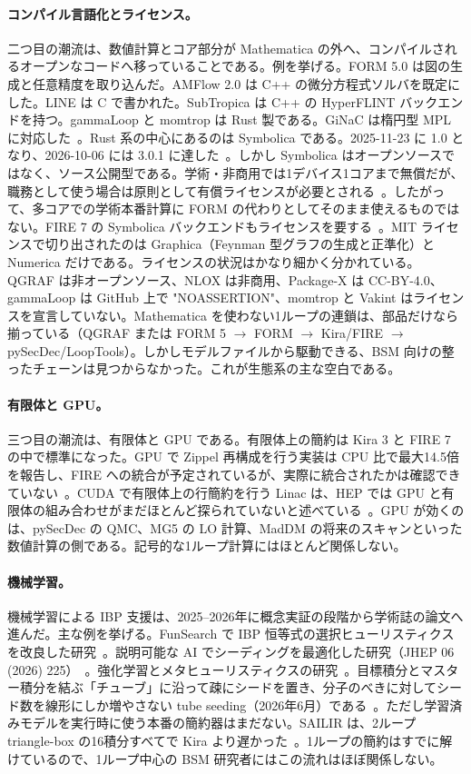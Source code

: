 \documentclass[a4paper,10pt]{ltjsarticle}
\begin{document}
\paragraph{コンパイル言語化とライセンス。}二つ目の潮流は、数値計算とコア部分が Mathematica の外へ、コンパイルされるオープンなコードへ移っていることである。例を挙げる。FORM 5.0 は図の生成と任意精度を取り込んだ。AMFlow 2.0 は C++ の微分方程式ソルバを既定にした。LINE は C で書かれた。SubTropica は C++ の HyperFLINT バックエンドを持つ。gammaLoop と momtrop は Rust 製である。GiNaC は楕円型 MPL に対応した~\cite{r16,r95,r116}。Rust 系の中心にあるのは Symbolica である。2025-11-23 に 1.0 となり、2026-10-06 には 3.0.1 に達した~\cite{r161,r162}。しかし Symbolica はオープンソースではなく、ソース公開型である。学術・非商用では1デバイス1コアまで無償だが、職務として使う場合は原則として有償ライセンスが必要とされる~\cite{r163}。したがって、多コアでの学術本番計算に FORM の代わりとしてそのまま使えるものではない。FIRE 7 の Symbolica バックエンドもライセンスを要する~\cite{r76}。MIT ライセンスで切り出されたのは Graphica（Feynman 型グラフの生成と正準化）と Numerica だけである。ライセンスの状況はかなり細かく分かれている。QGRAF は非オープンソース、NLOX は非商用、Package-X は CC-BY-4.0、gammaLoop は GitHub 上で "NOASSERTION"、momtrop と Vakint はライセンスを宣言していない。Mathematica を使わない1ループの連鎖は、部品だけなら揃っている（QGRAF または FORM 5 $\to$ FORM $\to$ Kira/FIRE $\to$ pySecDec/LoopTools）。しかしモデルファイルから駆動できる、BSM 向けの整ったチェーンは見つからなかった。これが生態系の主な空白である。

\paragraph{有限体と GPU。}三つ目の潮流は、有限体と GPU である。有限体上の簡約は Kira 3 と FIRE 7 の中で標準になった。GPU で Zippel 再構成を行う実装は CPU 比で最大14.5倍を報告し、FIRE への統合が予定されているが、実際に統合されたかは確認できていない~\cite{r164}。CUDA で有限体上の行簡約を行う Linac は、HEP では GPU と有限体の組み合わせがまだほとんど探られていないと述べている~\cite{r165}。GPU が効くのは、pySecDec の QMC、MG5 の LO 計算、MadDM の将来のスキャンといった数値計算の側である。記号的な1ループ計算にはほとんど関係しない。

\paragraph{機械学習。}機械学習による IBP 支援は、2025--2026年に概念実証の段階から学術誌の論文へ進んだ。主な例を挙げる。FunSearch で IBP 恒等式の選択ヒューリスティクスを改良した研究~\cite{r166}。説明可能な AI でシーディングを最適化した研究（JHEP 06 (2026) 225）~\cite{r167}。強化学習とメタヒューリスティクスの研究~\cite{r168}。目標積分とマスター積分を結ぶ「チューブ」に沿って疎にシードを置き、分子のべきに対してシード数を線形にしか増やさない tube seeding（2026年6月）である~\cite{r169}。ただし学習済みモデルを実行時に使う本番の簡約器はまだない。SAILIR は、2ループ triangle-box の16積分すべてで Kira より遅かった~\cite{r170}。1ループの簡約はすでに解けているので、1ループ中心の BSM 研究者にはこの流れはほぼ関係しない。
\end{document}
